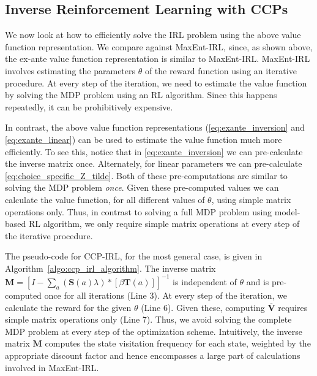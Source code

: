 \documentclass{article}
\begin{document}
\subsection{Inverse Reinforcement Learning with CCPs}
We now look at how to efficiently solve the IRL problem using the above value function representation. 
We compare against MaxEnt-IRL, since, as shown above, the ex-ante value function representation is similar to MaxEnt-IRL.
MaxEnt-IRL involves estimating the parameters $\theta$ of the reward function using an iterative procedure.
At every step of the iteration, we need to estimate the value function by solving the MDP problem using an RL algorithm. Since this happens repeatedly, it can be prohibitively expensive.

In contrast, the above value function representations (\eqref{eq:exante_inversion} and \eqref{eq:exante_linear}) can be used to estimate the value function much more efficiently. To see this, notice that in \eqref{eq:exante_inversion} we can pre-calculate the inverse matrix once. Alternately, for linear parameters we can pre-calculate \eqref{eq:choice_specific_Z_tilde}. Both of these pre-computations are similar to solving the MDP problem \textit{once}. Given these pre-computed values we can calculate the value function, for all different values of $\theta$, using simple matrix operations only. Thus, in contrast to solving a full MDP problem using model-based RL algorithm, we only require simple matrix operations at every step of the iterative procedure.

The pseudo-code for CCP-IRL, for the most general case, is given in Algorithm~\ref{algo:ccp_irl_algorithm}.
The inverse matrix $\mathbf{M}=\left[I-\sum_{a}(\mathbf{S}(a) \lambda) *\left[ \beta \mathbf{T}(a)  \right]\right]^{-1}$ is independent of $\theta$ and is pre-computed once for all iterations (Line 3).
At every step of the iteration, we calculate the reward for the given $\theta$ (Line 6). Given these, computing $\mathbf{\overline{V}}$ requires simple matrix operations only (Line 7). Thus, we avoid solving the complete MDP problem at every step of the optimization scheme.
Intuitively, the inverse matrix $\mathbf{M}$ computes the state visitation frequency for each state, weighted by the appropriate discount factor and hence encompasses a large part of calculations involved in MaxEnt-IRL.

\end{document}
